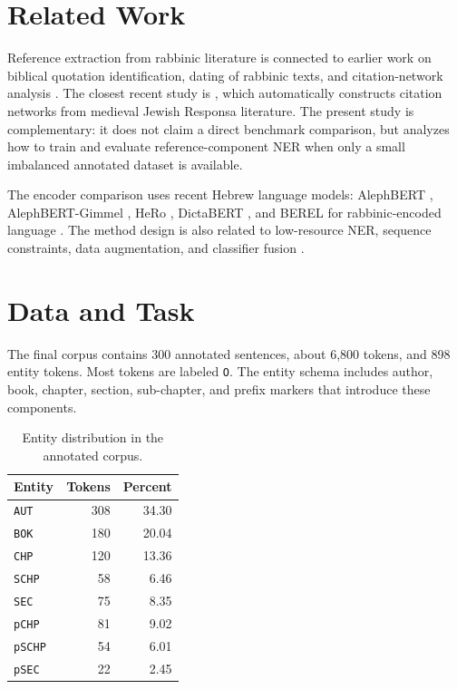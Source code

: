 \documentclass[11pt,a4paper]{article}
\begin{document}
\section{Related Work}
Reference extraction from rabbinic literature is connected to earlier work on biblical quotation identification, dating of rabbinic texts, and citation-network analysis \citep{hacohen2010,moghaz2019,satlow2022}. The closest recent study is \citet{bengigi2025}, which automatically constructs citation networks from medieval Jewish Responsa literature. The present study is complementary: it does not claim a direct benchmark comparison, but analyzes how to train and evaluate reference-component NER when only a small imbalanced annotated dataset is available.

The encoder comparison uses recent Hebrew language models: AlephBERT \citep{seker2022alephbert}, AlephBERT-Gimmel \citep{gueta2023alephgimmel}, HeRo \citep{shalumov2023hero}, DictaBERT \citep{shmidman2023dictabert}, and BEREL for rabbinic-encoded language \citep{shmidman2022berel}. The method design is also related to low-resource NER, sequence constraints, data augmentation, and classifier fusion \citep{li2022ner,nguyen2023auc,zhou2022melm,florian2003,awasthy2020}.

\section{Data and Task}
The final corpus contains 300 annotated sentences, about 6,800 tokens, and 898 entity tokens. Most tokens are labeled \texttt{O}. The entity schema includes author, book, chapter, section, sub-chapter, and prefix markers that introduce these components.

\begin{table}[htbp]
\centering
\small
\caption{Entity distribution in the annotated corpus.}
\label{tab:journal_entity_dist}
\begin{tabular}{lrr}
\toprule
Entity & Tokens & Percent \\
\midrule
\texttt{AUT} & 308 & 34.30 \\
\texttt{BOK} & 180 & 20.04 \\
\texttt{CHP} & 120 & 13.36 \\
\texttt{SCHP} & 58 & 6.46 \\
\texttt{SEC} & 75 & 8.35 \\
\texttt{pCHP} & 81 & 9.02 \\
\texttt{pSCHP} & 54 & 6.01 \\
\texttt{pSEC} & 22 & 2.45 \\
\bottomrule
\end{tabular}
\end{table}
\end{document}
